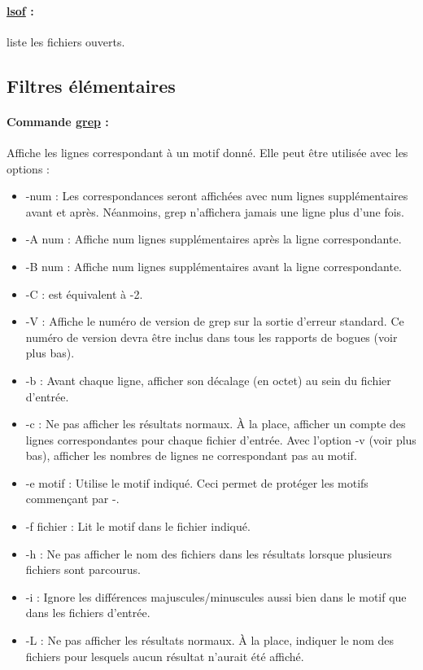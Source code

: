 \documentclass{article}[12pt]
\begin{document}
\paragraph{\href{http://jp.barralis.com/linux-man/man8/lsof.8.php}{lsof} : } liste les fichiers ouverts.
\subsection{Filtres élémentaires}
\paragraph{Commande \href{http://jp.barralis.com/linux-man/man1/grep.1.php}{grep} : } Affiche les lignes correspondant à un motif donné. Elle peut être utilisée avec les options :
\begin{itemize}
\item -num : Les correspondances seront affichées avec num lignes supplémentaires avant et après. Néanmoins, grep n'affichera jamais une ligne plus d'une fois.
\item -A num : Affiche num lignes supplémentaires après la ligne correspondante.
\item -B num : Affiche num lignes supplémentaires avant la ligne correspondante.
\item -C : est équivalent à -2.
\item -V : Affiche le numéro de version de grep sur la sortie d'erreur standard. Ce numéro de version devra être inclus dans tous les rapports de bogues (voir plus bas).
\item -b : Avant chaque ligne, afficher son décalage (en octet) au sein du fichier d'entrée.
\item -c : Ne pas afficher les résultats normaux. À la place, afficher un compte des lignes correspondantes pour chaque fichier d'entrée. Avec l'option -v (voir plus bas), afficher les nombres de lignes ne correspondant pas au motif.
\item -e motif : Utilise le motif indiqué. Ceci permet de protéger les motifs commençant par -.
\item -f fichier : Lit le motif dans le fichier indiqué.
\item -h : Ne pas afficher le nom des fichiers dans les résultats lorsque plusieurs fichiers sont parcourus.
\item -i : Ignore les différences majuscules/minuscules aussi bien dans le motif que dans les fichiers d'entrée.
\item -L : Ne pas afficher les résultats normaux. À la place, indiquer le nom des fichiers pour lesquels aucun résultat n'aurait été affiché.

\end{itemize}
\end{document}
